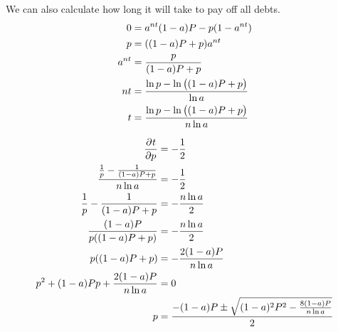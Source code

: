 \documentclass[12pt]{article}
\begin{document}
We can also calculate how long it will take to pay off all debts.
\begin{align*}
    0 &= a^{nt} (1 - a) P - p (1 - a^{nt})\\
    p &= ((1 - a) P + p) a^{nt}\\
    a^{nt} &= \frac{p}{(1 - a) P + p}\\
    nt &= \frac{\ln{p} - \ln\del{(1 - a) P + p}}{\ln{a}}\\
    t &= \frac{\ln{p} - \ln\del{(1 - a) P + p}}{n \ln{a}}\\
\end{align*}

\begin{align*}
    \dpd{t}{p} &= -\frac{1}{2}\\
    \frac{\frac{1}{p} - \frac{1}{(1 - a) P + p}}{n \ln{a}} &= -\frac{1}{2}\\
    \frac{1}{p} - \frac{1}{(1 - a) P + p} &= -\frac{n \ln{a}}{2}\\
    \frac{(1 - a) P}{p ((1 - a) P + p)} &= -\frac{n \ln{a}}{2}\\
    p ((1 - a) P + p) &= -\frac{2(1 - a) P}{n \ln{a}}\\
    p^2 + (1 - a) Pp + \frac{2(1 - a) P}{n \ln{a}} &= 0\\
    p &= \frac{-(1 - a) P \pm \sqrt{(1 - a)^2 P^2 - \frac{8(1 - a) P}{n \ln{a}}}}{2}\\
\end{align*}
\end{document}

